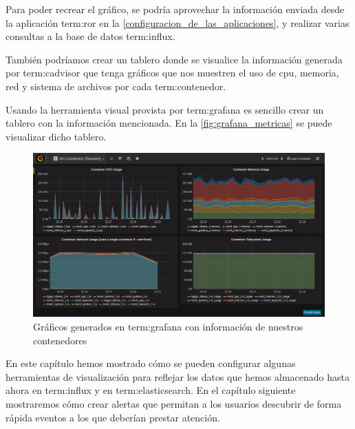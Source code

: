 Para poder recrear el gráfico, se podría aprovechar la información enviada desde
la aplicación \gls{term:ror} en la \autoref{configuracion_de_las_aplicaciones},
y realizar varias consultas a la base de datos \gls{term:influx}.

También podríamos crear un tablero donde se visualice la información generada
por \gls{term:cadvisor} que tenga gráficos que nos muestren el uso de
cpu, memoria, red y sistema de archivos por cada \gls{term:contenedor}.

Usando la herramienta visual provista por \gls{term:grafana} es sencillo crear
un tablero con la información mencionada. En la \autoref{fig:grafana_metricas}
se puede visualizar dicho tablero.

\begin{figure}
  \includegraphics[width=\linewidth]{src/images/05-capitulo-5/grafana_metricas.png}
  \caption{Gráficos generados en \gls{term:grafana} con información de nuestros contenedores}
  \label{fig:grafana_metricas}
\end{figure}

En este capítulo hemos mostrado cómo se pueden configurar algunas herramientas
de visualización para reflejar los datos que hemos almacenado hasta ahora en
\gls{term:influx} y en \gls{term:elasticsearch}. En el capítulo siguiente
mostraremos cómo crear alertas que permitan a los usuarios descubrir de forma
rápida eventos a los que deberían prestar atención.

